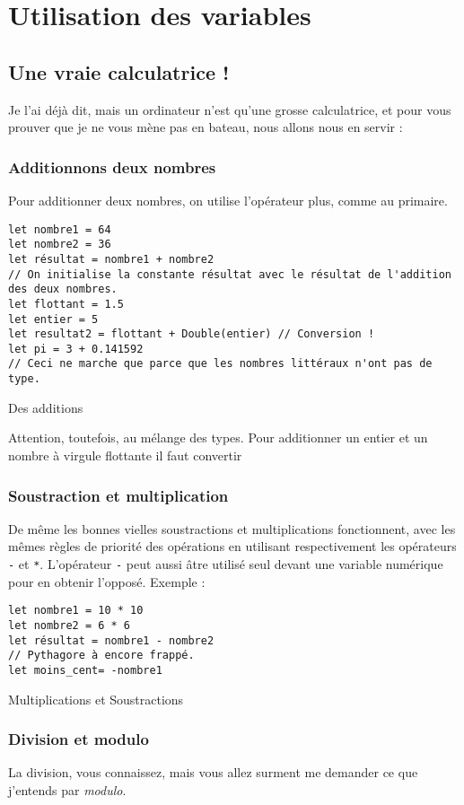 \chapter{Utilisation des variables}

\section{Une vraie calculatrice !}
Je l'ai déjà dit, mais un ordinateur n'est qu'une grosse calculatrice, et pour vous prouver que
je ne vous mène pas en bateau, nous allons nous en servir :
\subsection{Additionnons deux nombres}
Pour additionner deux nombres, on utilise l'opérateur plus, comme au primaire.
\begin{listing}
\begin{verbatim}
let nombre1 = 64
let nombre2 = 36
let résultat = nombre1 + nombre2
// On initialise la constante résultat avec le résultat de l'addition des deux nombres.
let flottant = 1.5
let entier = 5
let resultat2 = flottant + Double(entier) // Conversion !
let pi = 3 + 0.141592 
// Ceci ne marche que parce que les nombres littéraux n'ont pas de type.
\end{verbatim}
\caption{Des additions}
\end{listing}

Attention, toutefois, au mélange des types. Pour additionner un entier et un nombre à virgule flottante il faut convertir  
\subsection{Soustraction et multiplication}
De même les bonnes vielles soustractions et multiplications fonctionnent, avec les mêmes règles de priorité des opérations en utilisant respectivement les opérateurs \verb"-" et \verb"*".
L'opérateur \verb"-" peut aussi âtre utilisé seul devant une variable numérique pour en obtenir l'opposé.
Exemple :
\begin{listing}
\begin{verbatim}
let nombre1 = 10 * 10
let nombre2 = 6 * 6
let résultat = nombre1 - nombre2
// Pythagore à encore frappé. 
let moins_cent= -nombre1
\end{verbatim}
\caption{Multiplications et Soustractions}
\end{listing}

\subsection{Division et modulo}
La division, vous connaissez, mais vous allez surment me demander ce que j'entends par \emph{modulo}.

